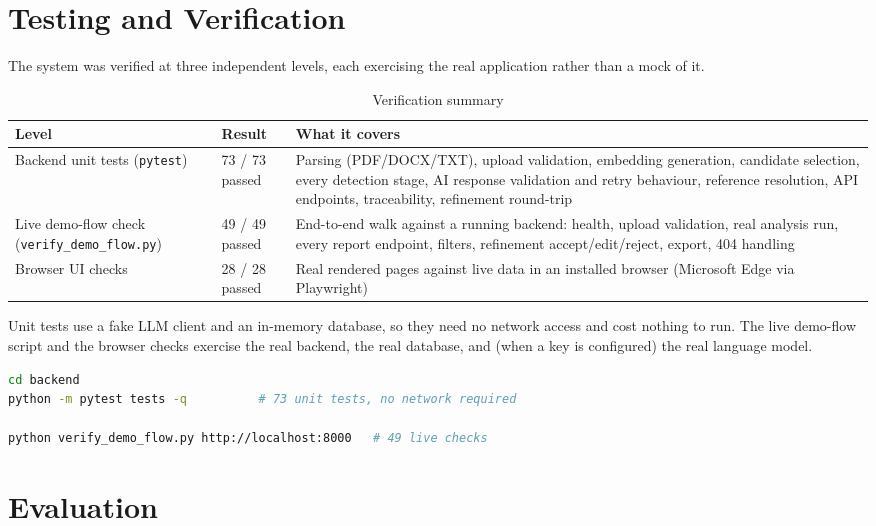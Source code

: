 \documentclass[11pt,a4paper]{article}
\begin{document}
\section{Testing and Verification}

The system was verified at three independent levels, each exercising the
real application rather than a mock of it.

\begin{table}[h!]
\centering
\begin{tabular}{p{5.2cm} p{3cm} p{5cm}}
\toprule
\textbf{Level} & \textbf{Result} & \textbf{What it covers} \\
\midrule
Backend unit tests (\texttt{pytest}) & 73 / 73 passed & Parsing (PDF/DOCX/TXT),
  upload validation, embedding generation, candidate selection, every
  detection stage, AI response validation and retry behaviour, reference
  resolution, API endpoints, traceability, refinement round-trip \\
Live demo-flow check (\texttt{verify\_demo\_flow.py}) & 49 / 49 passed &
  End-to-end walk against a running backend: health, upload validation,
  real analysis run, every report endpoint, filters, refinement
  accept/edit/reject, export, 404 handling \\
Browser UI checks & 28 / 28 passed & Real rendered pages against live data
  in an installed browser (Microsoft Edge via Playwright) \\
\bottomrule
\end{tabular}
\caption{Verification summary}
\end{table}

Unit tests use a fake LLM client and an in-memory database, so they need no
network access and cost nothing to run. The live demo-flow script and the
browser checks exercise the real backend, the real database, and (when a
key is configured) the real language model.

\begin{lstlisting}[language=bash, caption={Running the test suite}]
cd backend
python -m pytest tests -q          # 73 unit tests, no network required

python verify_demo_flow.py http://localhost:8000   # 49 live checks
\end{lstlisting}

\section{Evaluation}
\end{document}
